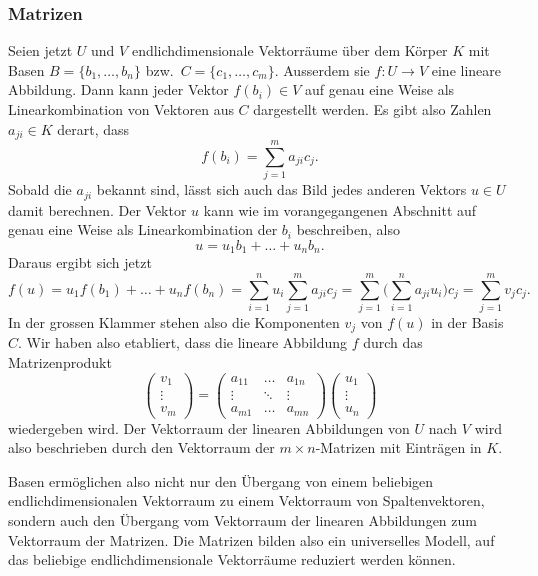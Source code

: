 \subsubsection{Matrizen}
Seien jetzt $U$ und $V$ endlichdimensionale Vektorräume über dem Körper $K$ 
mit Basen $B=\{b_1,\dots,b_n\}$ bzw.~$C=\{c_1,\dots,c_m\}$.
Ausserdem sie $f\colon U\to V$ eine lineare Abbildung.
Dann kann jeder Vektor $f(b_i)\in V$ auf genau eine Weise als
Linearkombination von Vektoren aus $C$ dargestellt werden.
Es gibt also Zahlen $a_{ji}\in K$ derart, dass
\[
f(b_i) = \sum_{j=1}^m a_{ji}c_j.
\]
Sobald die $a_{ji}$ bekannt sind, lässt sich auch das Bild jedes
anderen Vektors $u\in U$ damit berechnen.
Der Vektor $u$ kann wie im vorangegangenen Abschnitt auf genau eine
Weise als Linearkombination der $b_i$ beschreiben, also
\[
u= u_1b_1+\dots+u_nb_n.
\]
Daraus ergibt sich jetzt
\[
f(u)
=
u_1f(b_1)+\dots+u_nf(b_n)
=
\sum_{i=1}^n  u_i \sum_{j=1}^m a_{ji}c_j
=
\sum_{j=1}^m \biggl(
\sum_{i=1}^n
a_{ji} u_i
\biggr) c_j
=
\sum_{j=1}^m v_jc_j.
\]
In der grossen Klammer stehen also die Komponenten $v_j$ von $f(u)$ in der
Basis $C$.
Wir haben also etabliert, dass die lineare Abbildung $f$ durch das
Matrizenprodukt
\[
\begin{pmatrix}
v_1\\\vdots\\v_m
\end{pmatrix}
=
\begin{pmatrix}
a_{11}&\dots&a_{1n}\\
\vdots&\ddots&\vdots\\
a_{m1}&\dots&a_{mn}
\end{pmatrix}
\begin{pmatrix}
u_1\\\vdots\\u_n
\end{pmatrix}
\]
wiedergeben wird.
Der Vektorraum der linearen Abbildungen von $U$ nach $V$ wird also
beschrieben durch den Vektorraum der $m\times n$-Matrizen mit
Einträgen in $K$.

Basen ermöglichen also nicht nur den Übergang von einem beliebigen
endlichdimensionalen Vektorraum zu einem Vektorraum von Spaltenvektoren,
sondern auch den Übergang vom Vektorraum der linearen Abbildungen 
zum Vektorraum der Matrizen.
Die Matrizen bilden also ein universelles Modell, auf das beliebige 
endlichdimensionale Vektorräume reduziert werden können.

